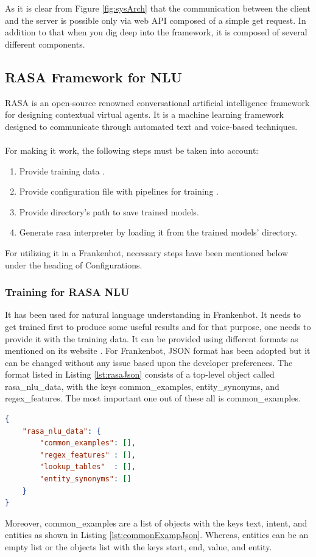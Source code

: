 \noindent
As it is clear from Figure \ref{fig:sysArch} that the communication between the client and the server is possible only via web API composed of a simple get request. In addition to that when you dig deep into the framework, it is composed of several different components.

\subsection{RASA Framework for NLU \label{subsec:rasanlu}}
RASA is an open-source renowned conversational artificial intelligence framework for designing contextual virtual agents. It is a machine learning framework designed to communicate through automated text and voice-based techniques. \cite{rasa}
\\~\\
For making it work, the following steps must be taken into account:
\begin{enumerate}
    \item Provide training data \cite{rasatrainingdata}.
    \item Provide configuration file with pipelines for training \cite{rasapipeline}.
    \item Provide directory's path to save trained models.
    \item Generate rasa interpreter by loading it from the trained models' directory.
\end{enumerate}
For utilizing it in a Frankenbot, necessary steps have been mentioned below under the heading of Configurations.
 
\subsubsection*{Training for RASA NLU}
It has been used for natural language understanding in Frankenbot. It needs to get trained first to produce some useful results and for that purpose, one needs to provide it with the training data. It can be provided using different formats as mentioned on its website \cite{rasatrainingdata}. For Frankenbot, JSON format has been adopted but it can be changed without any issue based upon the developer preferences. The format listed in Listing \ref{lst:rasaJson} consists of a top-level object called rasa\_nlu\_data, with the keys common\_examples, entity\_synonyms, and regex\_features. The most important one out of these all is common\_examples.

\begin{lstlisting}[language=json,firstnumber=1, caption=RASA NLU Training Data JSON Format., label={lst:rasaJson}]
{
    "rasa_nlu_data": {
        "common_examples": [],
        "regex_features" : [],
        "lookup_tables"  : [],
        "entity_synonyms": []
    }
}
\end{lstlisting}
\noindent
Moreover, common\_examples are a list of objects with the keys text, intent, and entities as shown in Listing \ref{lst:commonExampJson}. Whereas, entities can be an empty list or the objects list with the keys start, end, value, and entity.
 
